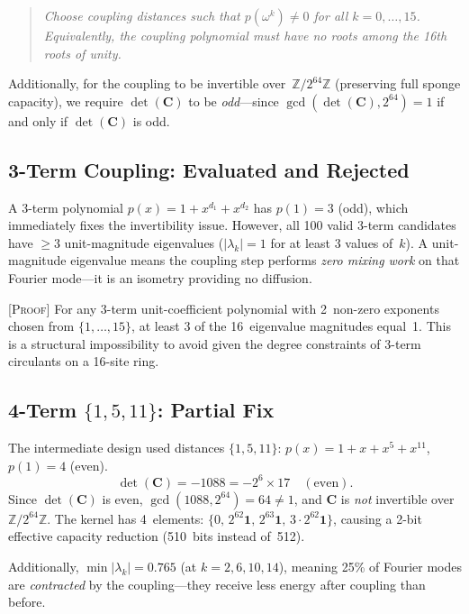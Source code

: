 \documentclass[runningheads]{llncs}
\newcommand{\proof}[1]{\textsc{[Proof]} #1}
\newcommand{\Ztwo}{\mathbb{Z}/2^{64}\mathbb{Z}}
\newcommand{\coupmat}{\mathbf{C}}
\begin{document}
\begin{quote}
\emph{Choose coupling distances such that $p(\omega^k) \neq 0$ for all
$k = 0, \ldots, 15$.  Equivalently, the coupling polynomial must have no roots
among the 16th roots of unity.}
\end{quote}

Additionally, for the coupling to be invertible over~$\Ztwo$ (preserving full
sponge capacity), we require $\det(\coupmat)$ to be \emph{odd}---since
$\gcd(\det(\coupmat), 2^{64}) = 1$ if and only if $\det(\coupmat)$ is odd.

\subsection{3-Term Coupling: Evaluated and Rejected}

A 3-term polynomial $p(x) = 1 + x^{d_1} + x^{d_2}$ has $p(1) = 3$ (odd),
which immediately fixes the invertibility issue.  However, all 100 valid 3-term
candidates have $\geq 3$ unit-magnitude eigenvalues ($|\lambda_k| = 1$ for at
least 3 values of~$k$).  A unit-magnitude eigenvalue means the coupling step
performs \emph{zero mixing work} on that Fourier mode---it is an isometry
providing no diffusion.

\proof{For any 3-term unit-coefficient polynomial with 2~non-zero exponents chosen
from $\{1, \ldots, 15\}$, at least 3 of the 16~eigenvalue magnitudes equal~1.
This is a structural impossibility to avoid given the degree constraints of
3-term circulants on a 16-site ring.}

\subsection{4-Term \texorpdfstring{$\{1,5,11\}$}{1,5,11}: Partial Fix}

The intermediate design used distances $\{1,5,11\}$:
$p(x) = 1 + x + x^5 + x^{11}$, $p(1) = 4$ (even).
\[
  \det(\coupmat) = -1088 = -2^6 \times 17 \quad (\text{even}).
\]
Since $\det(\coupmat)$ is even, $\gcd(1088, 2^{64}) = 64 \neq 1$, and $\coupmat$
is \emph{not} invertible over~$\Ztwo$.  The kernel has 4~elements:
$\{0,\, 2^{62}\mathbf{1},\, 2^{63}\mathbf{1},\, 3 \cdot 2^{62}\mathbf{1}\}$,
causing a 2-bit effective capacity reduction (510~bits instead of~512).

Additionally, $\min|\lambda_k| = 0.765$ (at $k = 2, 6, 10, 14$), meaning
25\% of Fourier modes are \emph{contracted} by the coupling---they receive
less energy after coupling than before.
\end{document}
